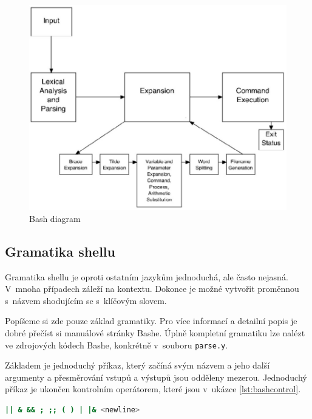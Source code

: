 \documentclass[thesis=M,czech]{FITthesis}[2012/06/26]
\begin{document}
\begin{figure}[htb]\centering
	\includegraphics[width=\textwidth]{./images/bash-article-diagram}
	\caption{Bash diagram \cite{bashdiagimg}}
	\label{fig:bash_diag}
\end{figure}




%
%
%
\subsection{Gramatika shellu}

Gramatika shellu je oproti ostatním jazykům jednoduchá, ale často nejasná. V~mnoha případech záleží na kontextu. Dokonce je možné vytvořit proměnnou s~názvem shodujícím se s~klíčovým slovem.

Popíšeme si zde pouze základ gramatiky. Pro více informací a detailní popis je dobré přečíst si manuálové stránky Bashe. Úplně kompletní gramatiku lze nalézt ve zdrojových kódech Bashe, konkrétně v~souboru \texttt{parse.y}.

Základem je jednoduchý příkaz, který začíná svým názvem a jeho další argumenty a přesměrování vstupů a výstupů jsou odděleny mezerou. Jednoduchý příkaz je ukončen kontrolním operátorem, které jsou v~ukázce \ref{lst:bashcontrol}.

\noindent
\begin{minipage}{\linewidth}
\begin{lstlisting}[language=bash, caption={Kontrolní operátory v~Bashi}, label={lst:bashcontrol}]
|| & && ; ;; ( ) | |& <newline>
\end{lstlisting}
\end{minipage}
\end{document}
